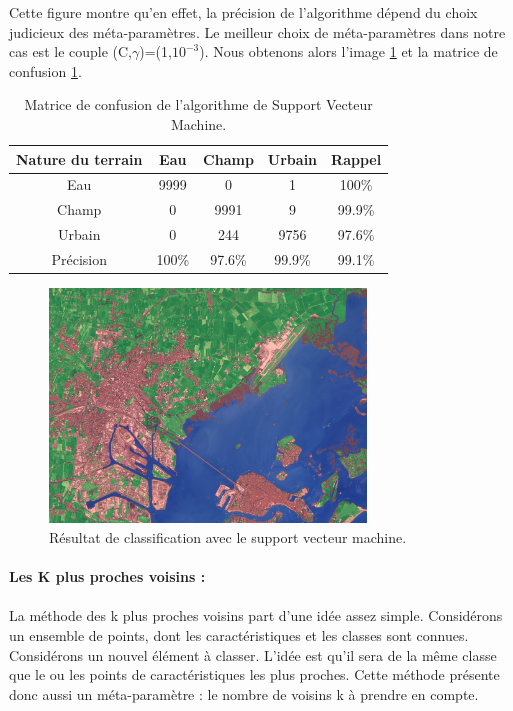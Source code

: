 \documentclass[a4paper,10pt]{article}
\begin{document}
Cette figure montre qu'en effet, la précision de l'algorithme dépend du choix judicieux des méta-paramètres. Le meilleur choix de méta-paramètres dans notre cas est le couple (C,$\gamma$)=(1,$ 10^{-3}$). Nous obtenons alors l'image \ref{fig:veniseSVM} et la matrice de confusion \ref{table:SVC}.

\begin{table}[H]
\begin{center}
 \begin{tabular}{|c|c|c|c|c|}
  \hline
  Nature du terrain & Eau & Champ & Urbain & Rappel \\
  \hline
Eau & 9999 & 0 & 	1 &	100\% \\
Champ & 0 &	9991 &	9 &	99.9\% \\
Urbain &  0 &	244 &	9756 &	97.6\% \\
Précision & 100\% & 97.6\% & 99.9\% & {\color{red}99.1\%} \\
  \hline
  \end{tabular}
\end{center}
\caption{Matrice de confusion de l'algorithme de Support Vecteur Machine.}
\label{table:SVC}
\end{table}

\begin{figure}[H]
  \centering
    \includegraphics[width=0.75\textwidth]{veniseSVM}
  \caption{Résultat de classification avec le support vecteur machine.}
  \label{fig:veniseSVM}
\end{figure}


\paragraph{Les K plus proches voisins :}
\paragraph{}
La méthode des k plus proches voisins part d'une idée assez simple. Considérons un ensemble de points, dont les caractéristiques et les classes sont connues. Considérons un nouvel élément à classer. L'idée est qu'il sera de la même classe que le ou les points de caractéristiques les plus proches. Cette méthode présente donc aussi un méta-paramètre : le nombre de voisins k à prendre en compte. 
\end{document}
